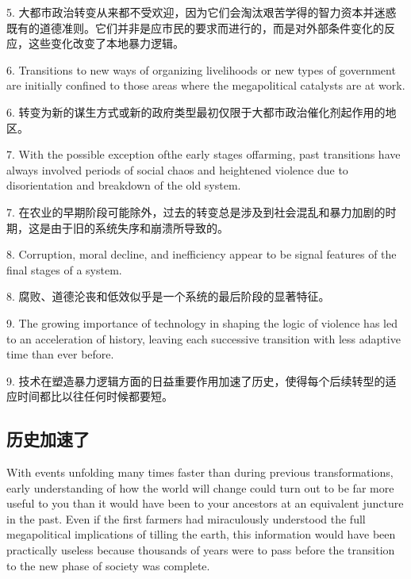 \begin{Parallel}{97mm}{45mm}
  \ParallelRText
  {5. 大都市政治转变从来都不受欢迎，因为它们会淘汰艰苦学得的智力资本并迷惑既有的道德准则。它们并非是应市民的要求而进行的，而是对外部条件变化的反应，这些变化改变了本地暴力逻辑。}
  \ParallelPar



  \ParallelLText
  {6. Transitions to new ways of organizing livelihoods or new types of government are initially confined to those areas where the megapolitical catalysts are at work.}
  
  \ParallelRText
  {6. 转变为新的谋生方式或新的政府类型最初仅限于大都市政治催化剂起作用的地区。}
  \ParallelPar



  \ParallelLText
  {7. With the possible exception ofthe early stages offarming, past transitions have always involved periods of social chaos and heightened violence due to disorientation and breakdown of the old system.}
  
  \ParallelRText
  {7. 在农业的早期阶段可能除外，过去的转变总是涉及到社会混乱和暴力加剧的时期，这是由于旧的系统失序和崩溃所导致的。}
  \ParallelPar



  \ParallelLText
  {8. Corruption, moral decline, and inefficiency appear to be signal features of the final stages of a system.}
  
  \ParallelRText
  {8. 腐败、道德沦丧和低效似乎是一个系统的最后阶段的显著特征。}
  \ParallelPar



  \ParallelLText
  {9. The growing importance of technology in shaping the logic of violence has led to an acceleration of history, leaving each successive transition with less adaptive time than ever before.}
  
  \ParallelRText
  {9. 技术在塑造暴力逻辑方面的日益重要作用加速了历史，使得每个后续转型的适应时间都比以往任何时候都要短。}
  \ParallelPar

  \subsection{历史加速了}

  \ParallelLText
  {With events unfolding many times faster than during previous transformations, early understanding of how the world will change could turn out to be far more useful to you than it would have been to your ancestors at an equivalent juncture in the past. Even if the first farmers had miraculously understood the full megapolitical implications of tilling the earth, this information would have been practically useless because thousands of years were to pass before the transition to the new phase of society was complete.}
  

\end{Parallel}
